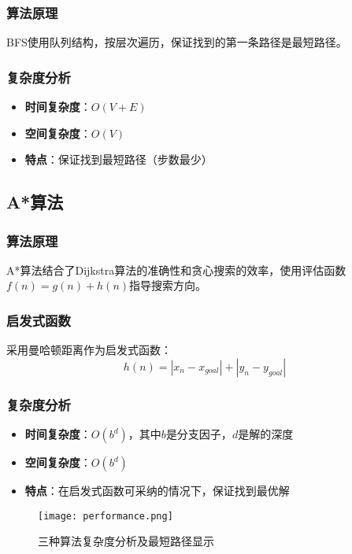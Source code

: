 \documentclass[UTF8]{ctexart}
\begin{document}
\subsubsection{算法原理}
BFS使用队列结构，按层次遍历，保证找到的第一条路径是最短路径。


\subsubsection{复杂度分析}
\begin{itemize}
    \item \textbf{时间复杂度}：$O(V + E)$
    \item \textbf{空间复杂度}：$O(V)$
    \item \textbf{特点}：保证找到最短路径（步数最少）
\end{itemize}

\subsection{A*算法}

\subsubsection{算法原理}
A*算法结合了Dijkstra算法的准确性和贪心搜索的效率，使用评估函数$f(n) = g(n) + h(n)$指导搜索方向。

\subsubsection{启发式函数}
采用曼哈顿距离作为启发式函数：
$$h(n) = |x_n - x_{goal}| + |y_n - y_{goal}|$$


\subsubsection{复杂度分析}
\begin{itemize}
    \item \textbf{时间复杂度}：$O(b^d)$，其中$b$是分支因子，$d$是解的深度
    \item \textbf{空间复杂度}：$O(b^d)$
    \item \textbf{特点}：在启发式函数可采纳的情况下，保证找到最优解
\end{itemize}

\begin{figure}[h!]
    \centering
    \texttt{[image: performance.png]}
    \caption{三种算法复杂度分析及最短路径显示}
    \label{fig:performance}
\end{figure}
\end{document}
